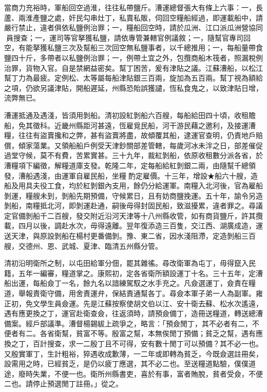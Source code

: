 \begin{pinyinscope}
當商力充裕時，軍船回空過淮，往往私帶鹽斤。漕運總督張大有條上六事：一，長蘆、兩淮產鹽之處，奸民勾串灶丁，私賣私販，伺回空糧船經過，即運載船中，請嚴行禁止，違者俱依私鹽例治罪；一，糧船回空時，請於瓜洲、江口派瓜洲營協同員搜查；一，運司等官拏獲私鹽，請依專管兼轄官例議敘；一，隨幫官專司回空，有能拏獲私鹽三次及幫船三次回空無私鹽事者，以千總推用；一，每船量帶食鹽四十斤，多帶者以私鹽例治罪；一，例帶土宜之外，包攬商船木筏者，照漏稅例治罪，貨物入官。自是禁網益密矣。幫丁困苦，爰有津貼之議。江蘇漕船，以松江幫丁力為最疲。定例松、太等屬每船津貼銀三百兩，旋加為五百兩。幫丁視為額給之項，仍欲另議津貼，開船遲延，州縣恐貽誤獲譴，恆私食鬼之，以致津貼日增，流弊無已。

漕運抵通及遇淺，皆須用剝船。清初設紅剝船六百艘，每船給田四十頃，收租贍船，免其徵科。近畿州縣距河甚遠，恆雇覓民船，河干游民藉之邀利，及接運漕糧，往往有盜賣攙和之弊，甚有盜賣將盡，故傾覆其船，逮運官查明，仍責地戶賠償，傾家蕩業。又領船船戶例受天津鈔關部差管轄，每歲河冰未泮之日，部差催促過堂守候，莫不有費，苦累實甚。三十九年，裁紅剝船，依原收租數分派各省，於漕糧項下編徵，解糧道庫支發。乾隆二年，定每船給紅剝銀二兩，由隨幫千總領發，漕船遇淺，由運軍自雇民船，坐糧酌定雇價。十三年，增設★船六十艘，造船及用具夫役工食，均於紅剝銀內支用，餘仍分給運軍。南糧入北河後，官為雇船剝運，糧艘未到，剝船先期預備，守候累日，且有妨商鹽挽運。五十年，諭令另造剝船，南糧抵北河，即剝運赴通，嗣後毋得封固民船，致滋擾累，違者罪之。尋議定官備剝船千二百艘，發交附近沿河天津等十八州縣收管，如有商貨鹽斤，許其攬載，四月以後，調赴水次，毋得遠離。翌年復添造三百隻，交江西、湖廣成造，運送天津，與原設剝船在楊村更番備剝。豫、東二省，因水淺阻滯，定造剝船三百艘，交德州、恩、武城、夏津、臨清五州縣分管。

清初沿明衛所之制，以屯田給軍分佃，罷其雜徭。尋改衛軍為屯丁，毋得竄入民籍，五年一編審，糧道掌之。康熙初，定各省衛所額設運丁十名。三十五年，定漕船出運，每船僉丁一名，餘九名以諳練駕馭之水手充之。凡僉選運丁，僉責在糧道，舉報責衛守備，用舍責運弁，保結責通幫各丁。尋僉本軍子弟一人為副軍。雍正初，免文學生員僉運。先是江蘇按察使胡文伯以江、安十衛去蘇、松水次遙遠，遇有應更換之丁，運官赴衛查僉，往返須時，請預僉備丁，造冊送糧道，轉送總漕備案。經戶部議準。漕督楊錫紱上疏爭之，略言：「預僉閒丁，其不必者有二，不便者有二。各省衛幫，貧富不等。殷富之幫，本無俟閒丁預備；貧乏之幫，遇有應換之丁，百計搜查，求一二殷丁且不可得，安有數十閒丁可以預備？其不必一也。又殷實軍丁，生計粗裕，猝遇收成歉薄，一二年或即轉為貧乏，今既僉選註冊矣，設需用之時，已經貧乏，是仍以疲丁應選，其不必二也。至送糧道點驗，僕僕道途，廢時失業，不便一也。衛所州縣書吏，喜於有事，富者賄脫，貧者受僉，不便二也。請停止預選閒丁註冊。」從之。


\end{pinyinscope}
